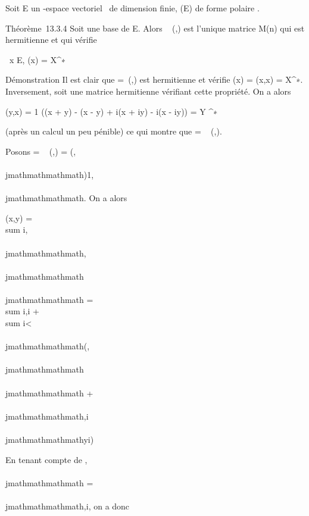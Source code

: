 Soit E un -espace vectoriel ~de dimension finie, \Phi \inQ(E) de forme
polaire \phi.

Théorème~13.3.4 Soit  une base de E. Alors
\mathrmMat~ (\phi,) est
l'unique matrice \Omega \in M(n) qui est hermitienne et qui vérifie

\forall~x \in E, \Phi(x) = X^∗~\OmegaX

Démonstration Il est clair que \Omega =\
\mathrmMat (\Phi,) est hermitienne et vérifie \Phi(x) =
\phi(x,x) = X^∗\OmegaX. Inversement, soit \Omega une matrice hermitienne
vérifiant cette propriété. On a alors

\phi(y,x) = 1  (\Phi(x + y) - \Phi(x - y) + i\Phi(x + iy)
- i\Phi(x - iy)) = Y ^∗\OmegaX

(après un calcul un peu pénible) ce qui montre que \Omega
= \mathrmMat~ (\phi,).

Posons \Omega = \mathrmMat~ (\phi,)
= (\omegai,\\\\jmathmathmathmath)1\leqi,\\\\jmathmathmathmath\leqn. On a alors

\phi(x,y) = \\sum
i,\\\\jmathmathmathmath\omegai,\\\\jmathmathmathmath\overlinexiy\\\\jmathmathmathmath
= \\sum
i\omegai,i\overlinexiyi
+ \\sum
i\textless{}\\\\jmathmathmathmath(\omegai,\\\\jmathmathmathmath\overlinexiy\\\\jmathmathmathmath
+ \omega\\\\jmathmathmathmath,i\overlinex\\\\jmathmathmathmathyi)

En tenant compte de \omegai,\\\\jmathmathmathmath =
\overline\omega\\\\jmathmathmathmath,i, on a donc

